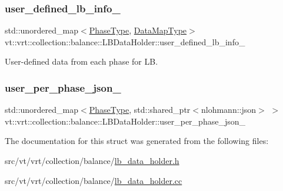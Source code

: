 \mbox{\label{structvt_1_1vrt_1_1collection_1_1balance_1_1_l_b_data_holder_ad5b8a5a6093c4edd34a10069551c1d19}} 
\subsubsection{\texorpdfstring{user\+\_\+defined\+\_\+lb\+\_\+info\+\_\+}{user\_defined\_lb\_info\_}}
{\footnotesize\ttfamily std\+::unordered\+\_\+map$<$\hyperlink{namespacevt_a46ce6733d5cdbd735d561b7b4029f6d7}{Phase\+Type}, \hyperlink{namespacevt_1_1vrt_1_1collection_1_1balance_acf152c668ed9e2e9c6b29784181d2435}{Data\+Map\+Type}$>$ vt\+::vrt\+::collection\+::balance\+::\+L\+B\+Data\+Holder\+::user\+\_\+defined\+\_\+lb\+\_\+info\+\_\+}



User-\/defined data from each phase for LB. 

\mbox{\label{structvt_1_1vrt_1_1collection_1_1balance_1_1_l_b_data_holder_aa4b11a094d2f858d29e4a91d61942ddf}} 
\subsubsection{\texorpdfstring{user\+\_\+per\+\_\+phase\+\_\+json\+\_\+}{user\_per\_phase\_json\_}}
{\footnotesize\ttfamily std\+::unordered\+\_\+map$<$\hyperlink{namespacevt_a46ce6733d5cdbd735d561b7b4029f6d7}{Phase\+Type}, std\+::shared\+\_\+ptr$<$nlohmann\+::json$>$ $>$ vt\+::vrt\+::collection\+::balance\+::\+L\+B\+Data\+Holder\+::user\+\_\+per\+\_\+phase\+\_\+json\+\_\+}



The documentation for this struct was generated from the following files\+:\begin{DoxyCompactItemize}
\item 
src/vt/vrt/collection/balance/\hyperlink{lb__data__holder_8h}{lb\+\_\+data\+\_\+holder.\+h}\item 
src/vt/vrt/collection/balance/\hyperlink{lb__data__holder_8cc}{lb\+\_\+data\+\_\+holder.\+cc}\end{DoxyCompactItemize}
